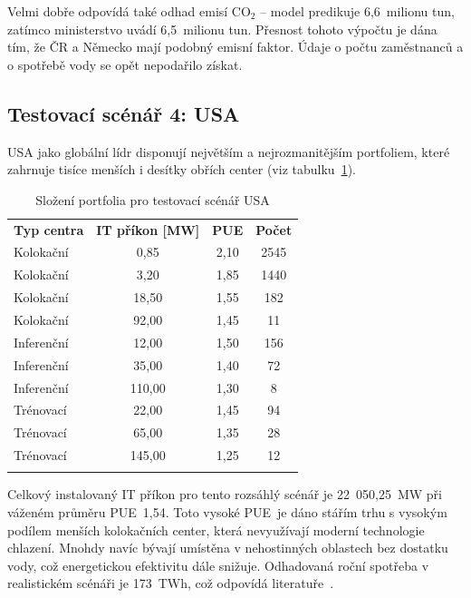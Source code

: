 Velmi dobře odpovídá také odhad emisí CO$_2$ -- model predikuje 6,6~milionu tun, zatímco ministerstvo \cite{testing_berlin_2025} uvádí 6,5~milionu tun. Přesnost tohoto výpočtu je dána tím, že ČR a Německo mají podobný emisní faktor. Údaje o počtu zaměstnanců a o spotřebě vody se opět nepodařilo získat. 

\subsection{Testovací scénář 4: USA}
\label{subsec:testovani_usa}

USA jako globální lídr disponují největším a nejrozmanitějším portfoliem, které zahrnuje tisíce menších i desítky obřích center (viz tabulku~\ref{tab:portfolio_usa}).

\begin{table}[bth]
    \centering
    \setlength{\tabcolsep}{6pt}

    \caption{Složení portfolia pro testovací scénář USA}
    \label{tab:portfolio_usa}

    \begin{tabular}{p{4cm}ccc}
        \toprule
        \addlinespace

        \textbf{Typ centra} & \textbf{IT příkon [MW]} & \textbf{PUE} & \textbf{Počet} \\

        \addlinespace
        \midrule
        \addlinespace

        Kolokační & 0,85 & 2,10 & 2545 \\
        Kolokační & 3,20 & 1,85 & 1440 \\
        Kolokační & 18,50 & 1,55 & 182 \\
        Kolokační & 92,00 & 1,45 & 11 \\
        Inferenční & 12,00 & 1,50 & 156 \\
        Inferenční & 35,00 & 1,40 & 72 \\
        Inferenční & 110,00 & 1,30 & 8 \\
        Trénovací & 22,00 & 1,45 & 94 \\
        Trénovací & 65,00 & 1,35 & 28 \\
        Trénovací & 145,00 & 1,25 & 12 \\

        \addlinespace
        \bottomrule
    \end{tabular}
\end{table}

Celkový instalovaný IT příkon pro tento rozsáhlý scénář je 22~050,25~MW při váženém průměru PUE~1,54. Toto vysoké PUE~je dáno stářím trhu s vysokým podílem menších kolokačních center, která nevyužívají moderní technologie chlazení. Mnohdy navíc bývají umístěna v nehostinných oblastech bez dostatku vody, což energetickou efektivitu dále snižuje. Odhadovaná roční spotřeba v realistickém scénáři je 173~TWh, což odpovídá literatuře~\cite{LBNL-2001637}.

